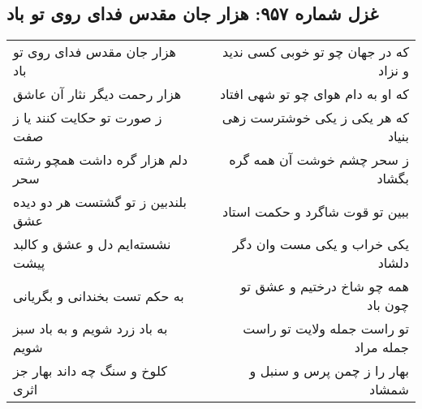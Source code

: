 \begin{center}
\section*{غزل شماره ۹۵۷: هزار جان مقدس فدای روی تو باد}
\label{sec:0957}
\begin{longtable}{l p{0.5cm} r}
هزار جان مقدس فدای روی تو باد
&&
که در جهان چو تو خوبی کسی ندید و نزاد
\\
هزار رحمت دیگر نثار آن عاشق
&&
که او به دام هوای چو تو شهی افتاد
\\
ز صورت تو حکایت کنند یا ز صفت
&&
که هر یکی ز یکی خوشترست زهی بنیاد
\\
دلم هزار گره داشت همچو رشته سحر
&&
ز سحر چشم خوشت آن همه گره بگشاد
\\
بلندبین ز تو گشتست هر دو دیده عشق
&&
ببین تو قوت شاگرد و حکمت استاد
\\
نشسته‌ایم دل و عشق و کالبد پیشت
&&
یکی خراب و یکی مست وان دگر دلشاد
\\
به حکم تست بخندانی و بگریانی
&&
همه چو شاخ درختیم و عشق تو چون باد
\\
به باد زرد شویم و به باد سبز شویم
&&
تو راست جمله ولایت تو راست جمله مراد
\\
کلوخ و سنگ چه داند بهار جز اثری
&&
بهار را ز چمن پرس و سنبل و شمشاد
\\
\end{longtable}
\end{center}
